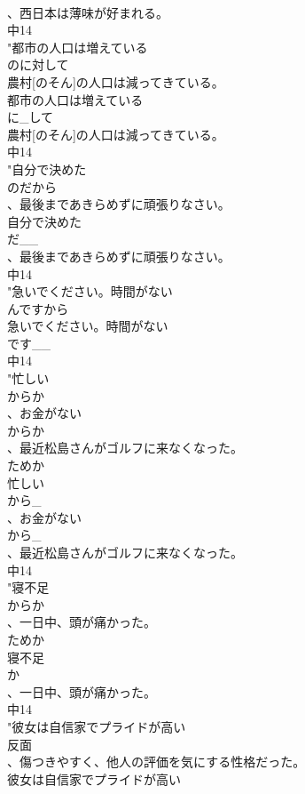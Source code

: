 \documentclass[8pt]{extreport}
\begin{document}
\begin{CJK}{UTF8}{min}
\\	、西日本は薄味が好まれる。
\\	中14
\\	"都市の人口は増えている
\\	のに対して
\\	農村[のそん]の人口は減ってきている。
\\	都市の人口は増えている
\\	に_して
\\	農村[のそん]の人口は減ってきている。
\\	中14
\\	"自分で決めた
\\	のだから
\\	、最後まであきらめずに頑張りなさい。
\\	自分で決めた
\\	だ__
\\	、最後まであきらめずに頑張りなさい。
\\	中14
\\	"急いでください。時間がない
\\	んですから
\\	急いでください。時間がない
\\	です__
\\	中14
\\	"忙しい
\\	からか
\\	、お金がない
\\	からか
\\	、最近松島さんがゴルフに来なくなった。
\\	ためか
\\	忙しい
\\	から_
\\	、お金がない
\\	から_
\\	、最近松島さんがゴルフに来なくなった。
\\	中14
\\	"寝不足
\\	からか
\\	、一日中、頭が痛かった。
\\	ためか
\\	寝不足
\\	か
\\	、一日中、頭が痛かった。
\\	中14
\\	"彼女は自信家でプライドが高い
\\	反面
\\	、傷つきやすく、他人の評価を気にする性格だった。
\\	彼女は自信家でプライドが高い

\end{CJK}
\end{document}
